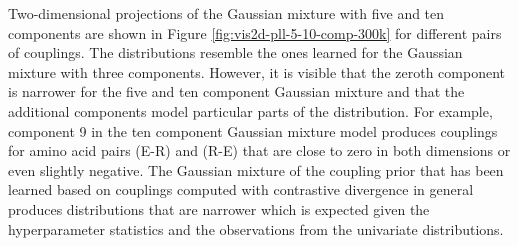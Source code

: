 \documentclass[11pt,a4paper,twoside]{book}
\theoremstyle{definition}
\theoremstyle{definition}
\theoremstyle{remark}
\begin{document}
Two-dimensional projections of the Gaussian mixture with five and ten
components are shown in Figure \ref{fig:vis2d-pll-5-10-comp-300k} for
different pairs of couplings. The distributions resemble the ones
learned for the Gaussian mixture with three components. However, it is
visible that the zeroth component is narrower for the five and ten
component Gaussian mixture and that the additional components model
particular parts of the distribution. For example, component 9 in the
ten component Gaussian mixture model produces couplings for amino acid
pairs (E-R) and (R-E) that are close to zero in both dimensions or even
slightly negative. The Gaussian mixture of the coupling prior that has
been learned based on couplings computed with contrastive divergence in
general produces distributions that are narrower which is expected given
the hyperparameter statistics and the observations from the univariate
distributions.
\end{document}
